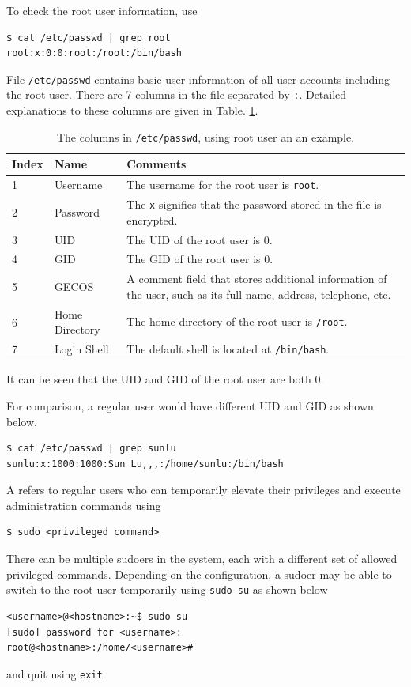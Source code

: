 To check the root user information, use
\begin{lstlisting}
$ cat /etc/passwd | grep root
root:x:0:0:root:/root:/bin/bash
\end{lstlisting}
File \verb|/etc/passwd| contains basic user information of all user accounts including the root user. There are 7 columns in the file separated by \verb|:|. Detailed explanations to these columns are given in Table. \ref{tab:etcpasswd}.
\begin{table}[!htb]
  \centering \caption{The columns in \texttt{/etc/passwd}, using root user an an example.}\label{tab:etcpasswd}
  \begin{tabularx}{\textwidth}{llX}
    \hline
    Index & Name & Comments \\ \hline
    1 & Username & The username for the root user is \verb|root|. \\ 
    2 & Password & The \verb|x| signifies that the password stored in the file is encrypted. \\ 
    3 & UID & The UID of the root user is 0. \\
    4 & GID & The GID of the root user is 0. \\
    5 & GECOS & A comment field that stores additional information of the user, such as its full name, address, telephone, etc. \\
    6 & Home Directory & The home directory of the root user is \verb|/root|. \\
    7 & Login Shell & The default shell is located at \verb|/bin/bash|. \\
    \hline
  \end{tabularx}
\end{table}
It can be seen that the UID and GID of the root user are both 0.

For comparison, a regular user would have different UID and GID as shown below.
\begin{lstlisting}
$ cat /etc/passwd | grep sunlu
sunlu:x:1000:1000:Sun Lu,,,:/home/sunlu:/bin/bash
\end{lstlisting}

A  refers to regular users who can temporarily elevate their privileges and execute administration commands using 
\begin{lstlisting}
$ sudo <privileged command>
\end{lstlisting}
There can be multiple sudoers in the system, each with a different set of allowed privileged commands. Depending on the configuration, a sudoer may be able to switch to the root user temporarily using \verb|sudo su| as shown below 
\begin{lstlisting}
<username>@<hostname>:~$ sudo su
[sudo] password for <username>:
root@<hostname>:/home/<username>#
\end{lstlisting}
and quit using \verb|exit|.

